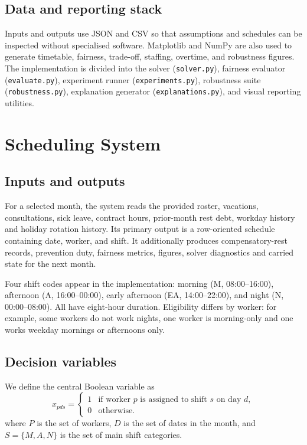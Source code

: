\documentclass[11pt,a4paper]{article}
\newcommand{\code}[1]{\texttt{#1}}
\begin{document}
\subsection{Data and reporting stack}

Inputs and outputs use JSON and CSV so that assumptions and schedules can be inspected without specialised software. Matplotlib and NumPy are also used to generate timetable, fairness, trade-off, staffing, overtime, and robustness figures. The implementation is divided into the solver (\code{solver.py}), fairness evaluator (\code{evaluate.py}), experiment runner (\code{experiments.py}), robustness suite (\code{robustness.py}), explanation generator (\code{explanations.py}), and visual reporting utilities.

\section{Scheduling System}

\subsection{Inputs and outputs}

For a selected month, the system reads the provided roster, vacations, consultations, sick leave, contract hours, prior-month rest debt, workday history and holiday rotation history. Its primary output is a row-oriented schedule containing date, worker, and shift. It additionally produces compensatory-rest records, prevention duty, fairness metrics, figures, solver diagnostics and carried state for the next month.

Four shift codes appear in the implementation: morning (M, 08:00--16:00), afternoon (A, 16:00--00:00), early afternoon (EA, 14:00--22:00), and night (N, 00:00--08:00). All have eight-hour duration. Eligibility differs by worker: for example, some workers do not work nights, one worker is morning-only and one works weekday mornings or afternoons only.

\subsection{Decision variables}

We define the central Boolean variable as
\[
x_{pds}=\begin{cases}
1 & \text{if worker }p\text{ is assigned to shift }s\text{ on day }d,\\
0 & \text{otherwise.}
\end{cases}
\]
where $P$ is the set of workers, $D$ is the set of dates in the month, and $S=\{M,A,N\}$ is the set of main shift categories.
\end{document}
